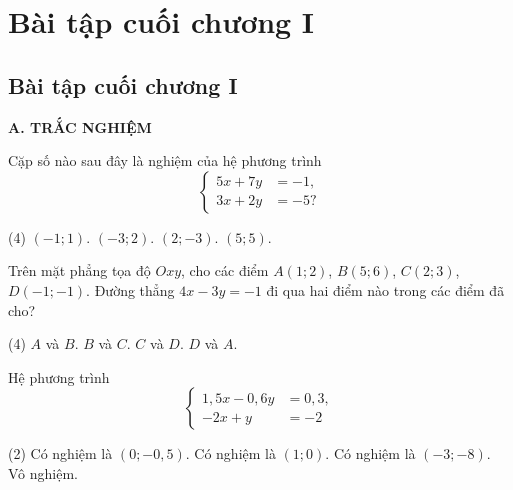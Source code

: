 
\section*{Bài tập cuối chương I}

\begin{exercises}
    \subsection{Bài tập cuối chương I}

    \textbf{A. TRẮC NGHIỆM}

    \begin{questions}[resume=SGK]
        \item Cặp số nào sau đây là nghiệm của hệ phương trình
        \[
            \left\{
            \begin{aligned}
                5x+7y&=-1,\\
                3x+2y&=-5?
            \end{aligned}
            \right.
        \]
        \begin{tasks}(4)
            \task $(-1;1)$.
            \task $(-3;2)$.
            \task $(2;-3)$.
            \task $(5;5)$.
        \end{tasks}
        \par\noindent\answerbox\par

        \item Trên mặt phẳng tọa độ $Oxy$, cho các điểm $A(1;2)$, $B(5;6)$, $C(2;3)$, $D(-1;-1)$. Đường thẳng $4x-3y=-1$ đi qua hai điểm nào trong các điểm đã cho?
        \begin{tasks}(4)
            \task $A$ và $B$.
            \task $B$ và $C$.
            \task $C$ và $D$.
            \task $D$ và $A$.
        \end{tasks}
        \par\noindent\answerbox\par

        \item Hệ phương trình
        \[
            \left\{
            \begin{aligned}
                1{,}5x-0{,}6y&=0{,}3,\\
                -2x+y&=-2
            \end{aligned}
            \right.
        \]
        \begin{tasks}(2)
            \task Có nghiệm là $(0;-0{,}5)$.
            \task Có nghiệm là $(1;0)$.
            \task Có nghiệm là $(-3;-8)$.
            \task Vô nghiệm.
        \end{tasks}
        \par\noindent\answerbox\par


\end{questions}
\end{exercises}
